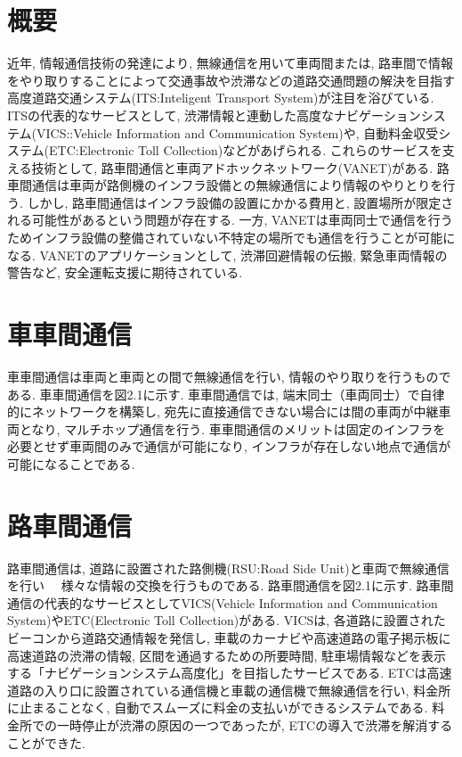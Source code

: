 \documentclass[10pt]{jreport}
\begin{document}
\section{概要}
近年, 情報通信技術の発達により, 無線通信を用いて車両間または, 路車間で情報をやり取りすることによって交通事故や渋滞などの道路交通問題の解決を目指す高度道路交通システム(ITS:Inteligent Transport System)が注目を浴びている\cite{sample7}. ITSの代表的なサービスとして, 渋滞情報と連動した高度なナビゲーションシステム(VICS::Vehicle Information and Communication System)\cite{sample8}や, 自動料金収受システム(ETC:Electronic Toll Collection)\cite{sample9}などがあげられる. これらのサービスを支える技術として, 路車間通信と車両アドホックネットワーク(VANET)がある. 路車間通信は車両が路側機のインフラ設備との無線通信により情報のやりとりを行う. しかし, 路車間通信はインフラ設備の設置にかかる費用と, 設置場所が限定される可能性があるという問題が存在する. 一方, VANETは車両同士で通信を行うためインフラ設備の整備されていない不特定の場所でも通信を行うことが可能になる. VANETのアプリケーションとして, 渋滞回避情報の伝搬, 緊急車両情報の警告など, 安全運転支援に期待されている. 
\section{車車間通信}
車車間通信は車両と車両との間で無線通信を行い, 情報のやり取りを行うものである. 車車間通信を図2.1に示す. 車車間通信では, 端末同士（車両同士）で自律的にネットワークを構築し, 宛先に直接通信できない場合には間の車両が中継車両となり, マルチホップ通信を行う. 車車間通信のメリットは固定のインフラを必要とせず車両間のみで通信が可能になり, インフラが存在しない地点で通信が可能になることである. 
\section{路車間通信}
路車間通信は, 道路に設置された路側機(RSU:Road Side Unit)と車両で無線通信を行い　
様々な情報の交換を行うものである. 路車間通信を図2.1に示す.  路車間通信の代表的なサービスとしてVICS(Vehicle Information and Communication System)やETC(Electronic Toll Collection)がある. VICSは, 各道路に設置されたビーコンから道路交通情報を発信し, 車載のカーナビや高速道路の電子掲示板に高速道路の渋滞の情報, 区間を通過するための所要時間, 駐車場情報などを表示する「ナビゲーションシステム高度化」を目指したサービスである. ETCは高速道路の入り口に設置されている通信機と車載の通信機で無線通信を行い, 料金所に止まることなく, 自動でスムーズに料金の支払いができるシステムである. 料金所での一時停止が渋滞の原因の一つであったが, ETCの導入で渋滞を解消することができた. 
\end{document}
